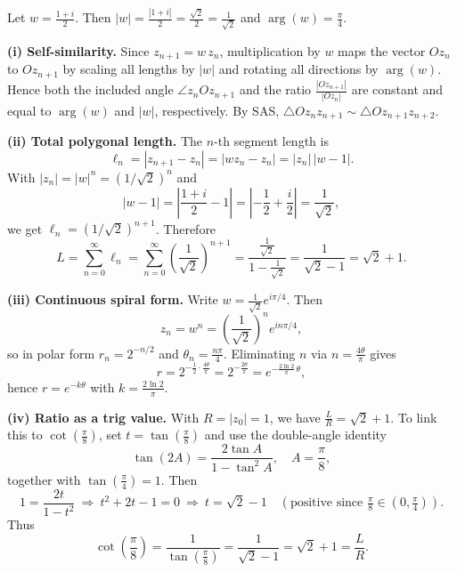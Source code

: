 \begin{solution}[Detailed]
Let $w=\frac{1+i}{2}$. Then $|w|=\frac{|1+i|}{2}=\frac{\sqrt{2}}{2}=\frac{1}{\sqrt{2}}$ and $\arg(w)=\frac{\pi}{4}$.

	\textbf{(i) Self-similarity.}
Since $z_{n+1}=w\,z_n$, multiplication by $w$ maps the vector $Oz_n$ to $Oz_{n+1}$ by scaling all lengths by $|w|$ and rotating all directions by $\arg(w)$. Hence both the included angle $\angle z_nOz_{n+1}$ and the ratio $\frac{|Oz_{n+1}|}{|Oz_n|}$ are constant and equal to $\arg(w)$ and $|w|$, respectively. By SAS, $\triangle Oz_nz_{n+1}\sim\triangle Oz_{n+1}z_{n+2}$.

	\textbf{(ii) Total polygonal length.}
The $n$-th segment length is
\[
\ell_n=|z_{n+1}-z_n|=|wz_n-z_n|=|z_n|\,|w-1|.
\]
With $|z_n|=|w|^n=(1/\sqrt{2})^n$ and
\[
|w-1|=\left|\frac{1+i}{2}-1\right|=\left|-\frac{1}{2}+\frac{i}{2}\right|=\frac{1}{\sqrt{2}},
\]
we get $\ell_n=(1/\sqrt{2})^{n+1}$. Therefore
\[
L=\sum_{n=0}^{\infty}\ell_n=\sum_{n=0}^{\infty}\left(\frac{1}{\sqrt{2}}\right)^{n+1}
=\frac{\frac{1}{\sqrt{2}}}{1-\frac{1}{\sqrt{2}}}
=\frac{1}{\sqrt{2}-1}
=\sqrt{2}+1.
\]

	\textbf{(iii) Continuous spiral form.}
Write $w=\frac{1}{\sqrt{2}}e^{i\pi/4}$. Then
\[
z_n=w^n=\left(\frac{1}{\sqrt{2}}\right)^n e^{in\pi/4},
\]
so in polar form $r_n=2^{-n/2}$ and $\theta_n=\frac{n\pi}{4}$. Eliminating $n$ via $n=\frac{4\theta}{\pi}$ gives
\[
r=2^{-\frac{1}{2}\cdot\frac{4\theta}{\pi}}=2^{-\frac{2\theta}{\pi}}
=e^{-\frac{2\ln 2}{\pi}\,\theta},
\]
hence $r=e^{-k\theta}$ with $k=\frac{2\ln 2}{\pi}$.

	\textbf{(iv) Ratio as a trig value.}
With $R=|z_0|=1$, we have $\frac{L}{R}=\sqrt{2}+1$. To link this to $\cot\!\left(\frac{\pi}{8}\right)$, set $t=\tan\!\left(\frac{\pi}{8}\right)$ and use the double-angle identity
\[
\tan(2A)=\frac{2\tan A}{1-\tan^2 A},\quad A=\frac{\pi}{8},
\]
together with $\tan\!\left(\frac{\pi}{4}\right)=1$. Then
\[
1=\frac{2t}{1-t^2}\ \Longrightarrow\ t^2+2t-1=0
\ \Longrightarrow\ t=\sqrt{2}-1 \quad(\text{positive since } \tfrac{\pi}{8}\in(0,\tfrac{\pi}{4})).
\]
Thus
\[
\cot\!\left(\frac{\pi}{8}\right)=\frac{1}{\tan\!\left(\frac{\pi}{8}\right)}=\frac{1}{\sqrt{2}-1}
=\sqrt{2}+1=\frac{L}{R}.
\]
\end{solution}


